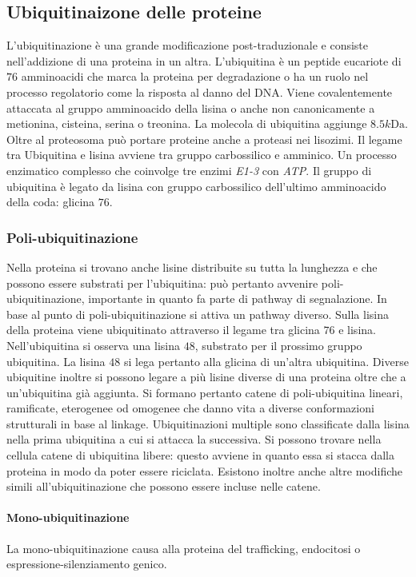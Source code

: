 \subsection{Ubiquitinaizone delle proteine}
L'ubiquitinazione \`e una grande modificazione post-traduzionale e consiste nell'addizione di una proteina in un altra. L'ubiquitina \`e un peptide eucariote di $76$ amminoacidi che marca la proteina per
degradazione o ha un ruolo nel processo regolatorio come la risposta al danno del DNA\@. Viene covalentemente attaccata al gruppo amminoacido della lisina o anche non canonicamente a metionina, cisteina,
serina o treonina. La molecola di ubiquitina aggiunge $8.5\si{k\dalton}$. Oltre al proteosoma pu\`o portare proteine anche a proteasi nei lisozimi. Il legame tra Ubiquitina e lisina avviene tra 
gruppo carbossilico e amminico. Un processo enzimatico complesso che coinvolge tre enzimi \emph{E1-3} con \emph{ATP}. Il gruppo di ubiquitina \`e legato da lisina con gruppo carbossilico dell'ultimo 
amminoacido della coda: glicina $76$.
\subsubsection{Poli-ubiquitinazione}
Nella proteina si trovano anche lisine distribuite su tutta la lunghezza e che possono essere substrati per l'ubiquitina: pu\`o pertanto avvenire poli-ubiquitinazione, importante in quanto fa parte di
pathway di segnalazione. In base al punto di poli-ubiquitinazione si attiva un pathway diverso. Sulla lisina della proteina viene ubiquitinato attraverso il legame tra glicina $76$ e lisina. 
Nell'ubiquitina si osserva una lisina $48$, substrato per il prossimo gruppo ubiquitina. La lisina $48$ si lega pertanto alla glicina di un'altra ubiquitina. Diverse ubiquitine inoltre si possono
legare a pi\`u lisine diverse di una proteina oltre che a un'ubiquitina gi\`a aggiunta. Si formano pertanto catene di poli-ubiquitina lineari, ramificate, eterogenee od omogenee che danno vita a 
diverse conformazioni strutturali in base al linkage. Ubiquitinazioni multiple sono classificate dalla lisina nella prima ubiquitina a cui si attacca la successiva. Si possono trovare nella cellula
catene di ubiquitina libere: questo avviene in quanto essa si stacca dalla proteina in modo da poter essere riciclata. Esistono inoltre anche altre modifiche simili  all'ubiquitinazione che possono
essere incluse nelle catene.
\paragraph{Mono-ubiquitinazione}
La mono-ubiquitinazione causa alla proteina del trafficking, endocitosi o espressione-silenziamento genico. 
